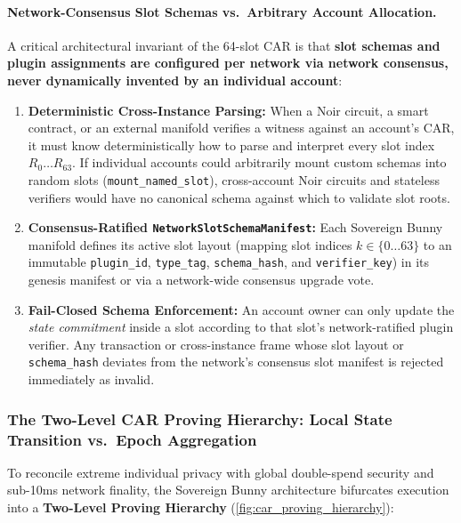\documentclass[a4paper,11pt,twoside,parskip=half-,headings=small]{scrartcl}
\newcommand{\code}[1]{\texttt{#1}}
\begin{document}
\paragraph{Network-Consensus Slot Schemas vs.\ Arbitrary Account Allocation.}
A critical architectural invariant of the 64-slot CAR is that \textbf{slot schemas and plugin assignments are configured per network via network consensus, never dynamically invented by an individual account}:
\begin{enumerate}[nosep]
  \item \textbf{Deterministic Cross-Instance Parsing:} When a Noir circuit, a smart contract, or an external manifold verifies a witness against an account's CAR, it must know deterministically how to parse and interpret every slot index $R_0 \dots R_{63}$. If individual accounts could arbitrarily mount custom schemas into random slots (\code{mount\_named\_slot}), cross-account Noir circuits and stateless verifiers would have no canonical schema against which to validate slot roots.
  \item \textbf{Consensus-Ratified \code{NetworkSlotSchemaManifest}:} Each Sovereign Bunny manifold defines its active slot layout (mapping slot indices $k \in \{0 \dots 63\}$ to an immutable \code{plugin\_id}, \code{type\_tag}, \code{schema\_hash}, and \code{verifier\_key}) in its genesis manifest or via a network-wide consensus upgrade vote.
  \item \textbf{Fail-Closed Schema Enforcement:} An account owner can only update the \emph{state commitment} inside a slot according to that slot's network-ratified plugin verifier. Any transaction or cross-instance frame whose slot layout or \code{schema\_hash} deviates from the network's consensus slot manifest is rejected immediately as invalid.
\end{enumerate}

\subsubsection{The Two-Level CAR Proving Hierarchy: Local State Transition vs.\ Epoch Aggregation}
\label{sec:car_proving_hierarchy}

To reconcile extreme individual privacy with global double-spend security and sub-10ms network finality, the Sovereign Bunny architecture bifurcates execution into a \textbf{Two-Level Proving Hierarchy} (\cref{fig:car_proving_hierarchy}):
\end{document}
